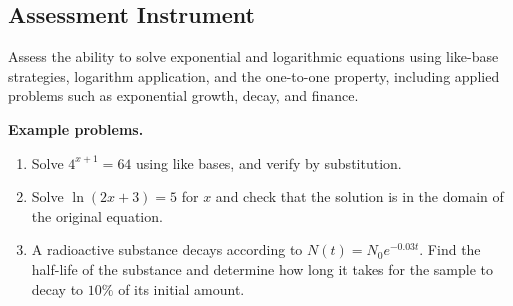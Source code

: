 \subsection{Assessment Instrument}
\label{ssec:asse-3669}

Assess the ability to solve exponential and logarithmic equations using like-base
strategies, logarithm application, and the one-to-one property, including applied problems
such as exponential growth, decay, and finance.

\textbf{Example problems.}
\begin{enumerate}
    \item Solve $4^{x+1} = 64$ using like bases, and verify by substitution.
    \item Solve $\ln(2x + 3) = 5$ for $x$ and check that the solution is in the domain of the original equation.
    \item A radioactive substance decays according to $N(t) = N_{0}e^{-0.03t}$. Find the half-life of the substance and determine how long it takes for the sample to decay to $10\%$ of its initial amount.
\end{enumerate}